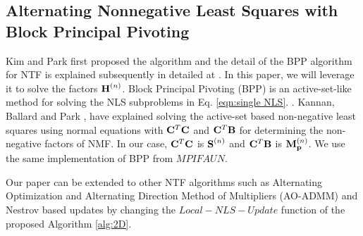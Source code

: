 \subsection{Alternating Nonnegative Least Squares with Block Principal Pivoting}
\label{sec:BPP}

Kim and Park \cite{KP2011} first proposed the algorithm and the detail of the BPP algorithm for NTF is explained subsequently in detailed at \cite{KHP2014}. In this paper, we will leverage it to solve the factors $\Mn{H}{n}$. 
Block Principal Pivoting (BPP) is an active-set-like method for solving the NLS subproblems in Eq. \eqref{eqn:single NLS}.
. 
Kannan, Ballard and Park \cite{KBP2018}, have explained solving the active-set based non-negative least squares 
using normal equations with $\mathbf{C}^T\mathbf{C}$ and $\mathbf{C}^T\mathbf{B}$ for determining the non-negative factors of NMF. 
In our case, $\mathbf{C}^T\mathbf{C}$ is $\Mn{S}{n}$ and $\mathbf{C}^T\mathbf{B}$ is $\Mn{M}{n}_{\V{p}}$. We use the same implementation
of BPP from $MPIFAUN$.

Our paper can be extended to other NTF algorithms such as Alternating Optimization and Alternating Direction Method of Multipliers (AO-ADMM) \cite{HSL2015, SBK2017} and Nestrov based updates
\cite{LKLHS2017} by changing the $Local-NLS-Update$ function of the proposed Algorithm \ref{alg:2D}. 